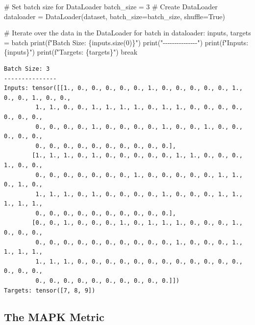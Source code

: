 \documentclass[
  letterpaper,
  DIV=11,
  numbers=noendperiod]{scrreprt}
\newenvironment{Shaded}{\begin{snugshade}}{\end{snugshade}}
\newcommand{\BuiltInTok}[1]{\textcolor[rgb]{0.00,0.23,0.31}{#1}}
\newcommand{\CommentTok}[1]{\textcolor[rgb]{0.37,0.37,0.37}{#1}}
\newcommand{\ControlFlowTok}[1]{\textcolor[rgb]{0.00,0.23,0.31}{#1}}
\newcommand{\DecValTok}[1]{\textcolor[rgb]{0.68,0.00,0.00}{#1}}
\newcommand{\KeywordTok}[1]{\textcolor[rgb]{0.00,0.23,0.31}{#1}}
\newcommand{\NormalTok}[1]{\textcolor[rgb]{0.00,0.23,0.31}{#1}}
\newcommand{\OperatorTok}[1]{\textcolor[rgb]{0.37,0.37,0.37}{#1}}
\newcommand{\SpecialCharTok}[1]{\textcolor[rgb]{0.37,0.37,0.37}{#1}}
\newcommand{\SpecialStringTok}[1]{\textcolor[rgb]{0.13,0.47,0.30}{#1}}
\newcommand{\StringTok}[1]{\textcolor[rgb]{0.13,0.47,0.30}{#1}}
\newcommand{\VariableTok}[1]{\textcolor[rgb]{0.07,0.07,0.07}{#1}}
\begin{document}
\begin{Shaded}
\begin{Highlighting}[]
\CommentTok{\# Set batch size for DataLoader}
\NormalTok{batch\_size }\OperatorTok{=} \DecValTok{3}
\CommentTok{\# Create DataLoader}
\NormalTok{dataloader }\OperatorTok{=}\NormalTok{ DataLoader(dataset, batch\_size}\OperatorTok{=}\NormalTok{batch\_size, shuffle}\OperatorTok{=}\VariableTok{True}\NormalTok{)}

\CommentTok{\# Iterate over the data in the DataLoader}
\ControlFlowTok{for}\NormalTok{ batch }\KeywordTok{in}\NormalTok{ dataloader:}
\NormalTok{    inputs, targets }\OperatorTok{=}\NormalTok{ batch}
    \BuiltInTok{print}\NormalTok{(}\SpecialStringTok{f"Batch Size: }\SpecialCharTok{\{}\NormalTok{inputs}\SpecialCharTok{.}\NormalTok{size(}\DecValTok{0}\NormalTok{)}\SpecialCharTok{\}}\SpecialStringTok{"}\NormalTok{)}
    \BuiltInTok{print}\NormalTok{(}\StringTok{"{-}{-}{-}{-}{-}{-}{-}{-}{-}{-}{-}{-}{-}{-}{-}"}\NormalTok{)}
    \BuiltInTok{print}\NormalTok{(}\SpecialStringTok{f"Inputs: }\SpecialCharTok{\{}\NormalTok{inputs}\SpecialCharTok{\}}\SpecialStringTok{"}\NormalTok{)}
    \BuiltInTok{print}\NormalTok{(}\SpecialStringTok{f"Targets: }\SpecialCharTok{\{}\NormalTok{targets}\SpecialCharTok{\}}\SpecialStringTok{"}\NormalTok{)}
    \ControlFlowTok{break}
\end{Highlighting}
\end{Shaded}

\begin{verbatim}
Batch Size: 3
---------------
Inputs: tensor([[1., 0., 0., 0., 0., 0., 1., 0., 0., 0., 0., 0., 1., 0., 0., 1., 0., 0.,
         1., 1., 0., 0., 1., 1., 1., 1., 0., 1., 1., 0., 0., 0., 0., 0., 0., 0.,
         0., 0., 0., 0., 1., 0., 0., 0., 0., 1., 0., 0., 1., 0., 0., 0., 0., 0.,
         0., 0., 0., 0., 0., 0., 0., 0., 0., 0.],
        [1., 1., 1., 0., 1., 0., 0., 0., 0., 0., 1., 1., 0., 0., 0., 1., 0., 0.,
         0., 0., 0., 0., 0., 0., 0., 1., 0., 0., 0., 0., 0., 1., 1., 0., 1., 0.,
         1., 1., 1., 0., 1., 0., 0., 0., 0., 1., 0., 0., 0., 1., 1., 1., 1., 1.,
         0., 0., 0., 0., 0., 0., 0., 0., 0., 0.],
        [0., 0., 1., 0., 0., 0., 1., 0., 1., 1., 1., 0., 0., 0., 1., 0., 0., 0.,
         0., 0., 0., 0., 0., 0., 0., 0., 0., 0., 1., 0., 0., 0., 1., 1., 1., 1.,
         1., 1., 1., 0., 0., 0., 0., 0., 0., 0., 0., 0., 0., 0., 0., 0., 0., 0.,
         0., 0., 0., 0., 0., 0., 0., 0., 0., 0.]])
Targets: tensor([7, 8, 9])
\end{verbatim}

\hypertarget{sec-the-mapk-metric-31}{%
\subsection{The MAPK Metric}\label{sec-the-mapk-metric-31}}
\end{document}
